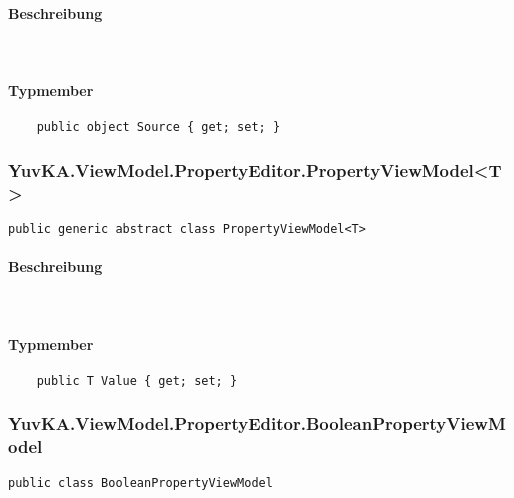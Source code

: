 \paragraph{Beschreibung}~\\
\paragraph{Typmember}
\begin{itemize}

	\begin{verbatim}
	public object Source { get; set; }
	\end{verbatim}

\end{itemize}




\subsubsection{YuvKA.ViewModel.PropertyEditor.PropertyViewModel<T>}

\begin{verbatim}
public generic abstract class PropertyViewModel<T>
\end{verbatim}

\paragraph{Beschreibung}~\\
\paragraph{Typmember}
\begin{itemize}

	\begin{verbatim}
	public T Value { get; set; }
	\end{verbatim}

\end{itemize}




\subsubsection{YuvKA.ViewModel.PropertyEditor.BooleanPropertyViewModel}

\begin{verbatim}
public class BooleanPropertyViewModel
\end{verbatim}

